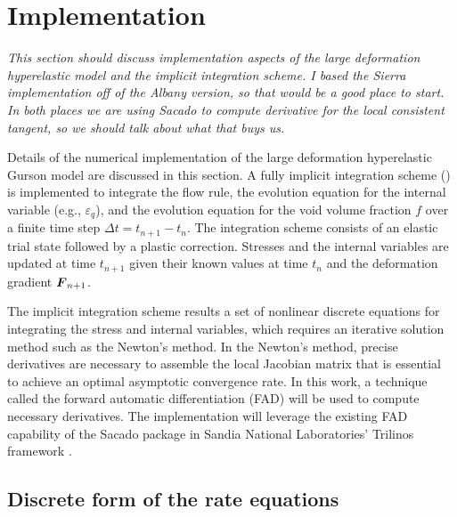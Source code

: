 \chapter{Implementation}
\label{implementation}

\textit{This section should discuss implementation aspects of the
  large deformation hyperelastic model and the implicit integration
  scheme. I based the Sierra implementation off of the Albany version,
  so that would be a good place to start. In both places we are using
  Sacado to compute derivative for the local consistent tangent, so we
  should talk about what that buys us.}

Details of the numerical implementation of the large deformation
hyperelastic Gurson model are discussed in this section. A fully
implicit integration scheme (\cite{SimoHughes:98, Steinmann1994}) is
implemented to integrate the flow rule, the evolution equation for the 
internal variable (e.g., $\varepsilon_q$), and the evolution equation 
for the void volume fraction $f$ over a finite time step 
$\Delta t = t_{n+1} - t_n$. The integration scheme consists of an 
elastic trial state followed by a plastic correction. Stresses and the 
internal variables are updated at time $t_{n+1}$ given their known 
values at time $t_n$ and the deformation gradient ${\boldsymbol{F}}_{n+1}$.

The implicit integration scheme results a set of nonlinear discrete 
equations for integrating the stress and internal variables, which 
requires an iterative solution method such as the Newton's method. In 
the Newton's method, precise derivatives are necessary to assemble 
the local Jacobian matrix that is essential to achieve an optimal 
asymptotic convergence rate. In this work, a technique called the
forward automatic differentiation (FAD) will be used to compute 
necessary derivatives. The implementation will leverage the existing 
FAD capability of the Sacado package in Sandia National Laboratories'
Trilinos framework \cite{Heroux2003}.

\section{Discrete form of the rate equations}

